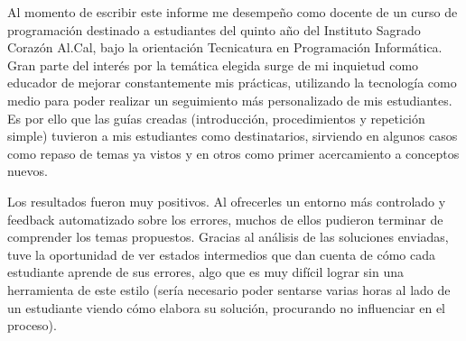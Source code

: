 Al momento de escribir este informe me desempeño como docente de un curso de programación destinado a estudiantes del quinto año del Instituto Sagrado Corazón Al.Cal, bajo la orientación Tecnicatura en Programación Informática. Gran parte del interés por la temática elegida surge de mi inquietud como educador de mejorar constantemente mis prácticas, utilizando la tecnología como medio para poder realizar un seguimiento más personalizado de mis estudiantes. Es por ello que las guías creadas (introducción, procedimientos y repetición simple) tuvieron a mis estudiantes como destinatarios, sirviendo en algunos casos como repaso de temas ya vistos y en otros como primer acercamiento a conceptos nuevos.

Los resultados fueron muy positivos. Al ofrecerles un entorno más controlado y feedback automatizado sobre los errores, muchos de ellos pudieron terminar de comprender los temas propuestos. Gracias al análisis de las soluciones enviadas, tuve la oportunidad de ver estados intermedios que dan cuenta de cómo cada estudiante aprende de sus errores, algo que es muy difícil lograr sin una herramienta de este estilo (sería necesario poder sentarse varias horas al lado de un estudiante viendo cómo elabora su solución, procurando no influenciar en el proceso).
